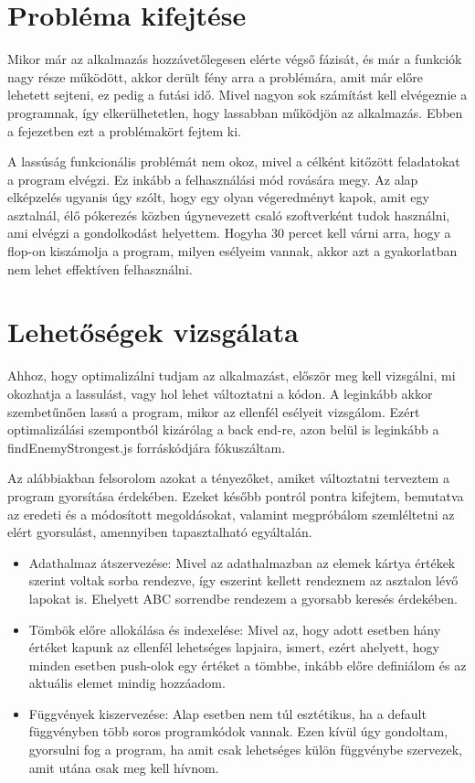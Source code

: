 
\section{Probléma kifejtése}
Mikor már az alkalmazás hozzávetőlegesen elérte végső fázisát, és már a funkciók nagy része működött, akkor derült fény arra a problémára, amit már előre lehetett sejteni, ez pedig a futási idő. Mivel nagyon sok számítást kell elvégeznie a programnak, így elkerülhetetlen, hogy lassabban működjön az alkalmazás. Ebben a fejezetben ezt a problémakört fejtem ki.

A lassúság funkcionális problémát nem okoz, mivel a célként kitőzött feladatokat a program elvégzi. Ez inkább a felhasználási mód rovására megy. Az alap elképzelés ugyanis úgy szólt, hogy egy olyan végeredményt kapok, amit egy asztalnál, élő pókerezés közben úgynevezett csaló szoftverként tudok használni, ami elvégzi a gondolkodást helyettem. Hogyha 30 percet kell várni arra, hogy a flop-on kiszámolja a program, milyen esélyeim vannak, akkor azt a gyakorlatban nem lehet effektíven felhasználni.

\section{Lehetőségek vizsgálata}
Ahhoz, hogy optimalizálni tudjam az alkalmazást, először meg kell vizsgálni, mi okozhatja a lassulást, vagy hol lehet változtatni a kódon. A leginkább akkor szembetűnően lassú a program, mikor az ellenfél esélyeit vizsgálom. Ezért optimalizálási szempontból kizárólag a back end-re, azon belül is leginkább a findEnemyStrongest.js forráskódjára fókuszáltam.

Az alábbiakban felsorolom azokat a tényezőket, amiket változtatni terveztem a program gyorsítása érdekében. Ezeket később pontról pontra kifejtem, bemutatva az eredeti és a módosított megoldásokat, valamint megpróbálom szemléltetni az elért gyorsulást, amennyiben tapasztalható egyáltalán.
\begin{itemize}
    \item Adathalmaz átszervezése: Mivel az adathalmazban az elemek kártya értékek szerint voltak sorba rendezve, így eszerint kellett rendeznem az asztalon lévő lapokat is. Ehelyett ABC sorrendbe rendezem a gyorsabb keresés érdekében.
    \item Tömbök előre allokálása és indexelése: Mivel az, hogy adott esetben hány értéket kapunk az ellenfél lehetséges lapjaira, ismert, ezért ahelyett, hogy minden esetben push-olok egy értéket a tömbbe, inkább előre definiálom és az aktuális elemet mindig hozzáadom.
    \item Függvények kiszervezése: Alap esetben nem túl esztétikus, ha a default függvényben több soros programkódok vannak. Ezen kívül úgy gondoltam, gyorsulni fog a program, ha amit csak lehetséges külön függvénybe szervezek, amit utána csak meg kell hívnom.
\end{itemize}

